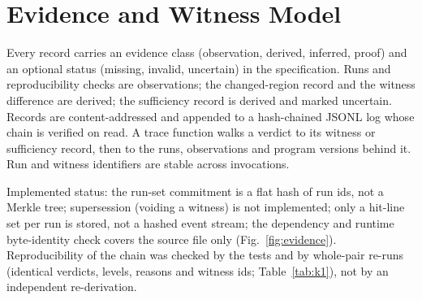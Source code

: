 \section{Evidence and Witness Model}\label{sec:evidence}
Every record carries an evidence class (observation, derived, inferred, proof) and an optional status (missing, invalid, uncertain) in the specification. Runs and reproducibility checks are observations; the changed-region record and the witness difference are derived; the sufficiency record is derived and marked uncertain. Records are content-addressed and appended to a hash-chained JSONL log whose chain is verified on read. A trace function walks a verdict to its witness or sufficiency record, then to the runs, observations and program versions behind it. Run and witness identifiers are stable across invocations.

Implemented status: the run-set commitment is a flat hash of run ids, not a Merkle tree; supersession (voiding a witness) is not implemented; only a hit-line set per run is stored, not a hashed event stream; the dependency and runtime byte-identity check covers the source file only (Fig.~\ref{fig:evidence}). Reproducibility of the chain was checked by the tests and by whole-pair re-runs (identical verdicts, levels, reasons and witness ids; Table~\ref{tab:k1}), not by an independent re-derivation.

